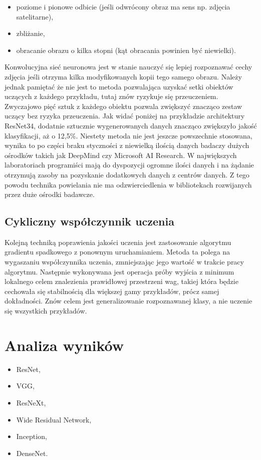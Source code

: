 \documentclass[12pt,a4paper,twoside,titlepage,openright]{book}
\begin{document}
\begin{itemize}
\item poziome i pionowe odbicie (jeśli odwrócony obraz ma sens np. zdjęcia satelitarne),
\item zbliżanie,
\item obracanie obrazu o kilka stopni (kąt obracania powinien być niewielki).
\end{itemize}

Konwolucyjna sieć neuronowa jest w stanie nauczyć się lepiej rozpoznawać cechy zdjęcia jeśli otrzyma kilka modyfikowanych kopii tego samego obrazu. Należy jednak pamiętać że nie jest to metoda pozwalająca uzyskać setki obiektów uczących z każdego przykładu, tutaj znów ryzykuje się przeuczeniem. Zwyczajowo pięć sztuk z każdego obiektu pozwala zwiększyć znacząco zestaw uczący bez ryzyka przeuczenia. 
Jak widać poniżej na przykładzie architektury ResNet34, dodatnie sztucznie wygenerowanych danych znacząco zwiększyło jakość klasyfikacji, aż o 12,5\%. Niestety metoda nie jest jeszcze powszechnie stosowana, wynika to po części braku styczności z niewielką ilością danych badaczy dużych ośrodków takich jak DeepMind czy Microsoft AI Research. W największych laboratoriach programiści mają do dyspozycji ogromne ilości danych i na żądanie otrzymują zasoby na pozyskanie dodatkowych danych z centrów danych. Z tego powodu technika powielania nie ma odzwierciedlenia w bibliotekach rozwijanych przez duże ośrodki badawcze. 

\subsection{Cykliczny współczynnik uczenia}
Kolejną techniką poprawienia jakości uczenia jest zastosowanie algorytmu gradientu spadkowego z ponownym uruchamianiem. Metoda ta polega na wygaszaniu współczynnika uczenia, zmniejszając jego wartość w trakcie pracy algorytmu. Następnie wykonywana jest operacja próby wyjścia z minimum lokalnego celem znalezienia prawidłowej przestrzeni wag, takiej która będzie cechowała się stabilnością dla większej gamy przykładów, prócz samej dokładności. Znów celem jest generalizowanie rozpoznawanej klasy, a nie uczenie się wszystkich przykładów. \cite{DBLP:journals/corr/HuangLPLHW17}

\section{Analiza wyników}
\begin{itemize}
\item ResNet,
\item VGG,
\item ResNeXt,
\item Wide Residual Network,
\item Inception,
\item DenseNet.
\end{itemize}
\end{document}
